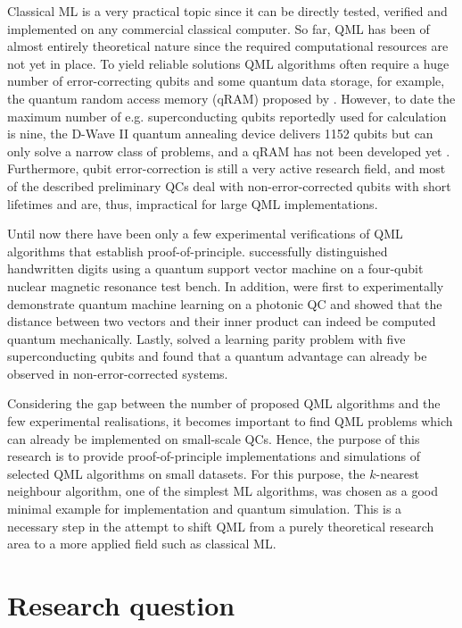 Classical ML is a very practical topic since it can be directly tested, verified and implemented on any commercial classical computer. So far, QML has been of almost entirely theoretical nature since the required computational resources are not yet in place. To yield reliable solutions QML algorithms often require a huge number of error-correcting qubits and some quantum data storage, for example, the quantum random access memory (qRAM) proposed by . However, to date the maximum number of e.g. superconducting qubits reportedly used for calculation is nine, the D-Wave II quantum annealing device delivers 1152 qubits but can only solve a narrow class of problems, and a qRAM has not been developed yet \cite{hydrogensimulation, dwave2}. Furthermore, qubit error-correction is still a very active research field, and most of the described preliminary QCs deal with non-error-corrected qubits with short lifetimes and are, thus, impractical for large QML implementations.

Until now there have been only a few experimental verifications of QML algorithms that establish proof-of-principle.  successfully distinguished handwritten digits using a quantum support vector machine on a four-qubit nuclear magnetic resonance test bench. In addition,  were first to experimentally demonstrate quantum machine learning on a photonic QC and showed that the distance between two vectors and their inner product can indeed be computed quantum mechanically. Lastly,  solved a learning parity problem with five superconducting qubits and found that a quantum advantage can already be observed in non-error-corrected systems.

Considering the gap between the number of proposed QML algorithms and the few experimental realisations, it becomes important to find QML problems which can already be implemented on small-scale QCs. Hence, the purpose of this research is to provide proof-of-principle implementations and simulations of selected QML algorithms on small datasets. For this purpose, the $k$-nearest neighbour algorithm, one of the simplest ML algorithms, was chosen as a good minimal example for implementation and quantum simulation. This is a necessary step in the attempt to shift QML from a purely theoretical research area to a more applied field such as classical ML.

\section{Research question}
\label{sec:researchquestion}


